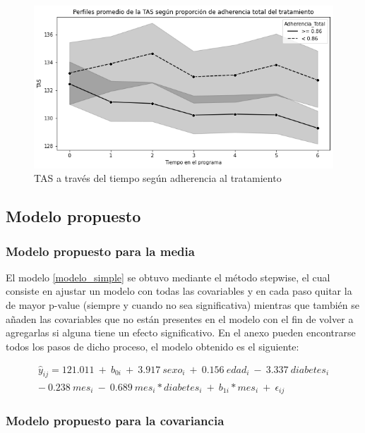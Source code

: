 \documentclass[spanish]{article}
\numberwithin{figure}{subsection}
\numberwithin{equation}{subsection}
\numberwithin{table}{subsection}
\begin{document}
\begin{figure}[H]
	\centering
	\includegraphics[scale=0.5]{img/TAS_vs_tpo_with_adherencia.png}
	\caption{TAS a través del tiempo según adherencia al tratamiento}
	\label{TAS_with_adh}
\end{figure}

\subsection{Modelo propuesto}

\subsubsection{Modelo propuesto para la media}

El modelo \ref{modelo_simple} se obtuvo mediante el método stepwise, el cual
consiste en ajustar un modelo con todas las covariables y en cada paso quitar la
de mayor p-value (siempre y cuando no sea significativa) mientras que también se
añaden las covariables que no están presentes en el modelo con el fin de volver
a agregarlas si alguna tiene un efecto significativo. En el anexo pueden
encontrarse todos los pasos de dicho proceso, el modelo obtenido es el
siguiente:


\begin{multline}
	\label{modelo_simple}
	\hat{y}_{ij} = 121.011\ +\ b_{0i}\ +\ 3.917\ sexo_i\ +\ 0.156\ edad_i\ -
	\ 3.337\ diabetes_i \\
	-\ 0.238\ mes_i\ -\ 0.689\ mes_i*diabetes_i\ +\ b_{1i}*mes_i\ +
	\ \epsilon_{ij}
\end{multline}

\subsubsection{Modelo propuesto para la covariancia}
\end{document}
